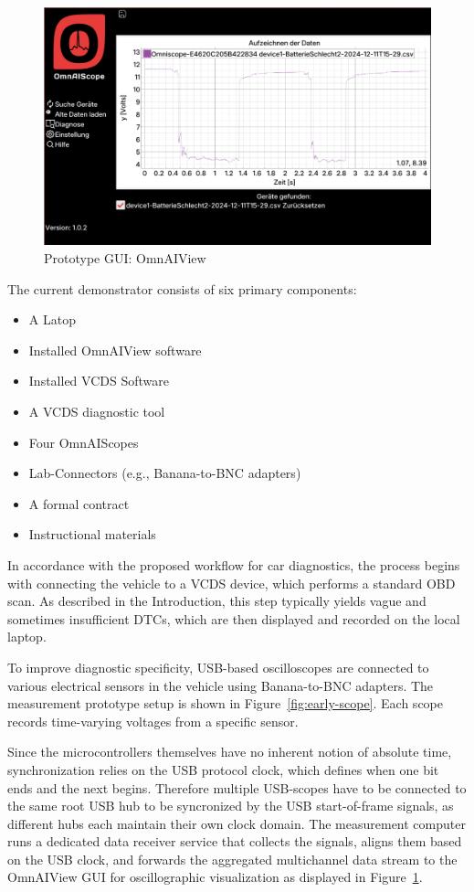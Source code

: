 \documentclass[conference,a4paper]{IEEEtran}
\begin{document}
\begin{figure}[ht]
  \centering
  \includegraphics[width=0.9\linewidth]{figures/legacy_gui.png}
  \caption{Prototype GUI: OmnAIView}
  \label{fig:gui}
\end{figure}

The current demonstrator consists of six primary components:
\begin{itemize}
  \item A Latop
  \item Installed OmnAIView software
  \item Installed VCDS Software
  \item A VCDS diagnostic tool
  \item Four OmnAIScopes
  \item Lab-Connectors (e.g., Banana-to-BNC adapters)
  \item A formal contract
  \item Instructional materials
\end{itemize}
In accordance with the proposed workflow for car diagnostics, the process begins with connecting the vehicle to a VCDS device, which performs a standard OBD scan. 
As described in the Introduction, this step typically yields vague and sometimes insufficient DTCs, which are then displayed and recorded on the local laptop.

To improve diagnostic specificity, USB-based oscilloscopes are connected to various electrical sensors in the vehicle using Banana-to-BNC adapters. 
The measurement prototype setup is shown in Figure~\ref{fig:early-scope}.
Each scope records time-varying voltages from a specific sensor. 

Since the microcontrollers themselves have no inherent notion of absolute time, synchronization relies on the USB protocol clock, which defines when one bit ends and the next begins. 
Therefore multiple USB-scopes have to be connected to the same root USB hub to be syncronized by the USB start-of-frame signals, as different hubs each maintain their own clock domain.
The measurement computer runs a dedicated data receiver service that collects the signals, aligns them based on the USB clock, and forwards the aggregated multichannel data stream to the OmnAIView GUI for oscillographic visualization as displayed in Figure~\ref{fig:gui}.
\end{document}
